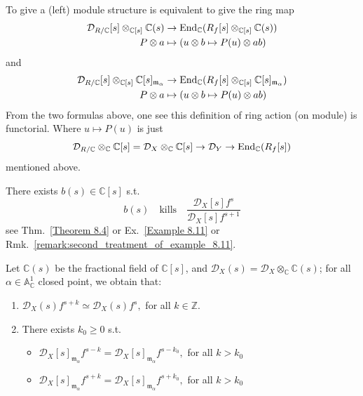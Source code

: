 \begin{remark}
    \medskip

    To give a (left) module structure is equivalent to give the ring map
    \begin{align*}
        \mathcal{D}_{R/\mathbb{C}}[s]\otimes_{\mathbb{C}[s]}\mathbb{C}(s) & \to \operatorname{End}_{\mathbb{C}}(R_f[s]\otimes_{\mathbb{C}[s]}\mathbb{C}(s))                    \\
        P \otimes a                      & \mapsto \left( u \otimes b \mapsto P(u) \otimes ab \right)
    \end{align*}
    and
    \begin{align*}
        \mathcal{D}_{R/\mathbb{C}}[s]\otimes_{\mathbb{C}[s]}\mathbb{C}[s]_{\frak{m}_\alpha} & \to \operatorname{End}_{\mathbb{C}}(R_f[s]\otimes_{\mathbb{C}[s]}\mathbb{C}[s]_{\frak{m}_\alpha})  \\
        P \otimes a                                        & \mapsto \left( u \otimes b \mapsto P(u) \otimes ab \right)
    \end{align*}
    From the two formulas above, one see this definition of ring action (on module) is functorial. Where $u\mapsto P(u)$ is just
    \[
        \mathcal{D}_{R/\mathbb{C}} \otimes_{\mathbb{C}} \mathbb{C}[s] = \mathcal{D}_X\otimes_{\mathbb{C}} \mathbb{C}[s] \to \mathcal{D}_Y \to \operatorname{End}_{\mathbb{C}}(R_f[s])
    \]
    mentioned above.
\end{remark}

\begin{theorem}\label{thm:existence_of_b_function}
    There exists $b(s) \in \mathbb{C}[s]$ s.t.
    \[
        b(s) \quad \mathrm{ kills } \quad \frac{\mathcal{D}_{X}[s]f^{s}}{\mathcal{D}_{X}[s]f^{s+1}}
    \]
    see Thm.~\ref{Theorem 8.4} or Ex.~\ref{Example 8.11} or Rmk.~\ref{remark:second_treatment_of_example_8.11}.
\end{theorem}



\begin{corollary}\label{cor:bernstein_beilinson}
    Let $\mathbb{C}(s)$ be the fractional field of $\mathbb{C}[s]$, and $\mathcal{D}_{X}(s) = \mathcal{D}_{X} \otimes_{\mathbb{C}} \mathbb{C}(s)$; for all $\alpha \in \mathbb{A}_{\mathbb{C}}^{1}$ closed point, we obtain that:
    \begin{enumerate}
        \item $\mathcal{D}_{X}(s) f^{s+k} \simeq \mathcal{D}_{X}(s) f^{s}, $ for all $  k \in \mathbb{Z}$.
        \item There exists $k_{0} \geqslant 0$ s.t.
              \begin{itemize}
                  \item $\mathcal{D}_{X}[s]_{\mathfrak{m}_{\alpha}} f^{s-k} = \mathcal{D}_{X}[s]_{\mathfrak{m}_{\alpha}} f^{s-k_{0}}, $ for all $ k > k_{0}$
                  \item $\mathcal{D}_{X}[s]_{\mathfrak{m}_{\alpha}} f^{s+k} = \mathcal{D}_{X}[s]_{\mathfrak{m}_{\alpha}} f^{s+k_{0}},$ for all $  k > k_{0}$
              \end{itemize}
    \end{enumerate}

\end{corollary}

